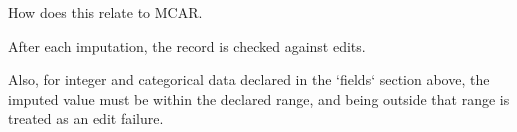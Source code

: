 \documentclass{article}
\begin{document}
How does this relate to MCAR.


After each imputation, the record is checked against edits. 

Also, for integer and categorical data declared in the `fields` section above, the imputed
value must be within the declared range, and being outside that range is treated as an edit failure.



\end{document}
